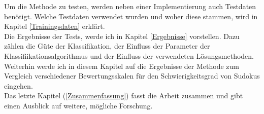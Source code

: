 Um die Methode zu testen, werden neben einer Implementierung auch Testdaten benötigt. Welche Testdaten verwendet wurden und woher diese stammen, wird in Kapitel \ref{Trainingsdaten} erklärt.\\
Die Ergebnisse der Tests, werde ich in Kapitel \ref{Ergebnisse} vorstellen. Dazu zählen die Güte der Klassifikation, der Einfluss der Parameter der Klassifiikationsalgorithmus und der Einfluss der verwendeten Lösungsmethoden. Weiterhin werde ich in diesem Kapitel auf die Ergebnisse der Methode zum Vergleich verschiedener Bewertungsskalen für den Schwierigkeitsgrad von Sudokus eingehen.\\
Das letzte Kapitel (\ref{Zusammenfassung}) fasst die Arbeit zusammen und gibt einen Ausblick auf weitere, mögliche Forschung.